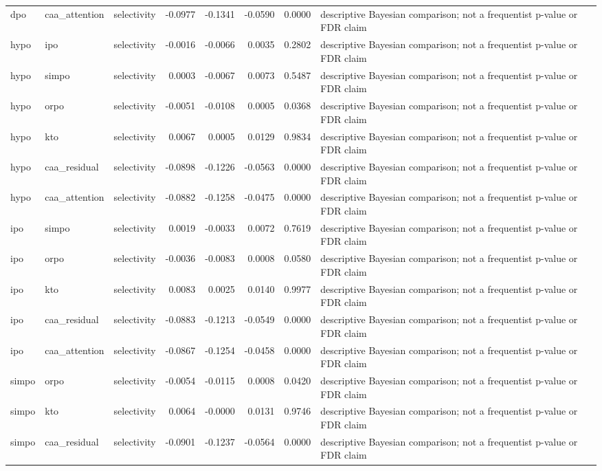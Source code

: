 \begin{tabular}{lllrrrrl}
dpo & caa\_attention & selectivity & -0.0977 & -0.1341 & -0.0590 & 0.0000 & descriptive Bayesian comparison; not a frequentist p-value or FDR claim \\
hypo & ipo & selectivity & -0.0016 & -0.0066 & 0.0035 & 0.2802 & descriptive Bayesian comparison; not a frequentist p-value or FDR claim \\
hypo & simpo & selectivity & 0.0003 & -0.0067 & 0.0073 & 0.5487 & descriptive Bayesian comparison; not a frequentist p-value or FDR claim \\
hypo & orpo & selectivity & -0.0051 & -0.0108 & 0.0005 & 0.0368 & descriptive Bayesian comparison; not a frequentist p-value or FDR claim \\
hypo & kto & selectivity & 0.0067 & 0.0005 & 0.0129 & 0.9834 & descriptive Bayesian comparison; not a frequentist p-value or FDR claim \\
hypo & caa\_residual & selectivity & -0.0898 & -0.1226 & -0.0563 & 0.0000 & descriptive Bayesian comparison; not a frequentist p-value or FDR claim \\
hypo & caa\_attention & selectivity & -0.0882 & -0.1258 & -0.0475 & 0.0000 & descriptive Bayesian comparison; not a frequentist p-value or FDR claim \\
ipo & simpo & selectivity & 0.0019 & -0.0033 & 0.0072 & 0.7619 & descriptive Bayesian comparison; not a frequentist p-value or FDR claim \\
ipo & orpo & selectivity & -0.0036 & -0.0083 & 0.0008 & 0.0580 & descriptive Bayesian comparison; not a frequentist p-value or FDR claim \\
ipo & kto & selectivity & 0.0083 & 0.0025 & 0.0140 & 0.9977 & descriptive Bayesian comparison; not a frequentist p-value or FDR claim \\
ipo & caa\_residual & selectivity & -0.0883 & -0.1213 & -0.0549 & 0.0000 & descriptive Bayesian comparison; not a frequentist p-value or FDR claim \\
ipo & caa\_attention & selectivity & -0.0867 & -0.1254 & -0.0458 & 0.0000 & descriptive Bayesian comparison; not a frequentist p-value or FDR claim \\
simpo & orpo & selectivity & -0.0054 & -0.0115 & 0.0008 & 0.0420 & descriptive Bayesian comparison; not a frequentist p-value or FDR claim \\
simpo & kto & selectivity & 0.0064 & -0.0000 & 0.0131 & 0.9746 & descriptive Bayesian comparison; not a frequentist p-value or FDR claim \\
simpo & caa\_residual & selectivity & -0.0901 & -0.1237 & -0.0564 & 0.0000 & descriptive Bayesian comparison; not a frequentist p-value or FDR claim \\

\end{tabular}
